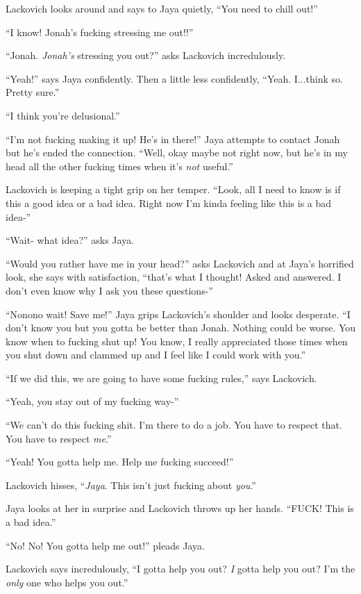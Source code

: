 Lackovich looks around and says to Jaya quietly, ``You need to chill out!''

``I know!  Jonah's fucking stressing me out!!''

``Jonah.  \textit{Jonah's} stressing you out?'' asks Lackovich incredulously.

``Yeah!'' says Jaya confidently. Then a little less confidently, ``Yeah.  I...think so.  Pretty sure.''

``I think you're delusional.''

``I'm not fucking making it up!  He's in there!'' Jaya attempts to contact Jonah but he's ended the connection. ``Well, okay maybe not right now, but he's in my head all the other fucking times when it's \textit{not} useful.''

Lackovich is keeping a tight grip on her temper.  ``Look, all I need to know is if this a good idea or a bad idea.  Right now I'm kinda feeling like this is a bad idea-''

``Wait- what idea?'' asks Jaya.

``Would you rather have me in your head?'' asks Lackovich and at Jaya's horrified look, she says with satisfaction, ``that's what I thought!  Asked and answered.  I don't even know why I ask you these questions-''

``Nonono wait!  Save me!'' Jaya grips Lackovich's shoulder and looks desperate.  ``I don't know you but you gotta be better than Jonah.  Nothing could be worse.  You know when to fucking shut up!  You know, I really appreciated those times when you shut down and clammed up and I feel like I could work with you.''

``If we did this, we are going to have some fucking rules,'' says Lackovich.

``Yeah, you stay out of my fucking way-''

``We can't do this fucking shit.  I'm there to do a job.  You have to respect that.  You have to respect \textit{me}.''

``Yeah!  You gotta help me.  Help me fucking succeed!''

Lackovich hisses, ``\textit{Jaya}.  This isn't just fucking about \textit{you}.''

Jaya looks at her in surprise and Lackovich throws up her hands. ``FUCK!  This is a bad idea.''

``No!  No!  You gotta help me out!'' pleads Jaya.  

Lackovich says incredulously, ``I gotta help you out?  \textit{I} gotta help you out?  I'm the \textit{only} one who helps you out.''

